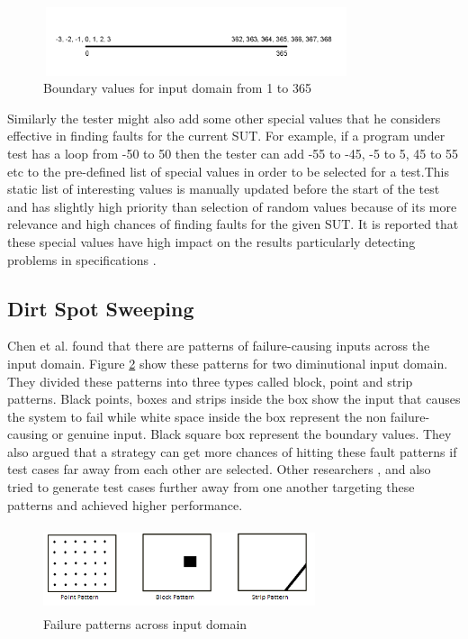 \documentclass[conference]{IEEEtran}
\begin{document}
\begin{figure}[ht]
\centering
\includegraphics[width= 9cm,height=2cm]{boundary.png}
\caption{Boundary values for input domain from 1 to 365}
\label{fig:boundaryValues}
\end{figure}

Similarly the tester might also add some other special values that he considers effective in finding faults for the current SUT. For example, if a program under test has a loop from -50 to 50 then the tester can add -55 to -45, -5 to 5, 45 to 55 etc to the pre-defined list of special values in order to be selected for a test.This static list of interesting values is manually updated before the start of the test and has slightly high priority than selection of random values because of its more relevance and high chances of finding faults for the given SUT. It is reported that these special values have high impact on the results particularly detecting problems in specifications \cite{Ciupa2008}.

\subsection{Dirt Spot Sweeping}
Chen et al. \cite{Chen2008} found that there are patterns of failure-causing inputs across the input domain. Figure \ref{fig:patterns} show these patterns for two diminutional input domain. They divided these patterns into three types called block, point and strip patterns. Black points, boxes and strips inside the box show the input that causes the system to fail while white space inside the box represent the non failure-causing or genuine input. Black square box represent the boundary values. They also argued that a strategy can get more chances of hitting these fault patterns if test cases far away from each other are selected. Other researchers \cite{Chan2002}, \cite{Chen2003} and \cite{Chen2005} also tried to generate test cases further away from one another targeting these patterns and achieved higher performance.\\
\begin{figure}[ht]                                    
\centering
\includegraphics[width= 8cm,height=2.5cm]{ART_Patterns.png}
\caption{Failure patterns across input domain \cite{Chen2008}}
\label{fig:patterns}
\end{figure}
\end{document}
